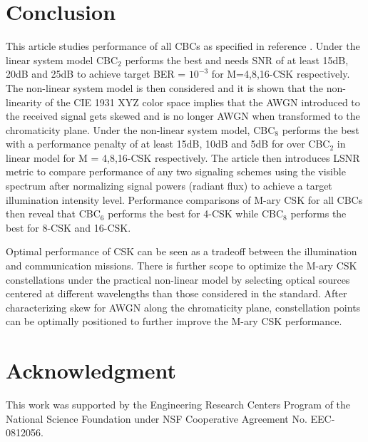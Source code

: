 \documentclass[10pt,letterpaper]{article}
\begin{document}
\section{Conclusion}\label{sCONC}
This article studies performance of all CBCs as specified in reference \cite{ieee802.15.7}. Under the linear system model CBC$_{2}$ performs the best and needs SNR of at least 15dB, 20dB and 25dB to achieve target BER = $10^{-3}$ for M=4,8,16-CSK respectively. The non-linear system model is then considered and it is shown that the non-linearity of the CIE 1931 XYZ color space implies that the AWGN introduced to the received signal gets skewed and is no longer AWGN when transformed to the chromaticity plane. Under the non-linear system model, CBC$_{8}$ performs the best with a performance penalty of at least 15dB, 10dB and 5dB for over CBC$_{2}$ in linear model for M = 4,8,16-CSK respectively. The article then introduces LSNR metric to compare performance of any two signaling schemes using the visible spectrum after normalizing signal powers (radiant flux) to achieve a target illumination intensity level. Performance comparisons of M-ary CSK for all CBCs then reveal that CBC$_{6}$ performs the best for 4-CSK while CBC$_{8}$ performs the best for 8-CSK and 16-CSK. 

Optimal performance of CSK can be seen as a tradeoff between the illumination and communication missions. There is further scope to optimize the M-ary CSK constellations under the practical non-linear model by selecting optical sources centered at different wavelengths than those considered in the standard. After characterizing skew for AWGN along the chromaticity plane, constellation points can be optimally positioned to further improve the M-ary CSK performance.

\section*{Acknowledgment}
This work was supported by the Engineering Research Centers Program of the National Science Foundation under NSF Cooperative Agreement No. EEC-0812056.
\end{document}
